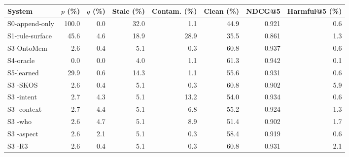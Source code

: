 \begin{tabular}{lrrrrrrr}
\toprule
System & $p$ (\%) & $q$ (\%) & Stale (\%) & Contam. (\%) & Clean (\%) & NDCG@5 & Harmful@5 (\%) \\
\midrule
S0-append-only & 100.0 & 0.0 & 32.0 & 1.1 & 44.9 & 0.921 & 0.6 \\
S1-rule-surface & 45.6 & 4.6 & 18.9 & 28.9 & 35.5 & 0.861 & 1.3 \\
S3-OntoMem & 2.6 & 0.4 & 5.1 & 0.3 & 60.8 & 0.937 & 0.6 \\
S4-oracle & 0.0 & 0.0 & 4.0 & 1.1 & 61.3 & 0.942 & 0.1 \\
S5-learned & 29.9 & 0.6 & 14.3 & 1.1 & 55.6 & 0.931 & 0.6 \\
S3 -SKOS & 2.6 & 0.4 & 5.1 & 0.3 & 60.8 & 0.902 & 5.9 \\
S3 -intent & 2.7 & 4.3 & 5.1 & 13.2 & 54.0 & 0.934 & 0.6 \\
S3 -context & 2.7 & 4.4 & 5.1 & 6.8 & 55.2 & 0.924 & 1.3 \\
S3 -who & 2.6 & 4.7 & 5.1 & 8.9 & 51.4 & 0.902 & 1.7 \\
S3 -aspect & 2.6 & 2.1 & 5.1 & 0.3 & 58.4 & 0.919 & 0.6 \\
S3 -R3 & 2.6 & 0.4 & 5.1 & 0.3 & 60.8 & 0.931 & 2.1 \\
\bottomrule
\end{tabular}
